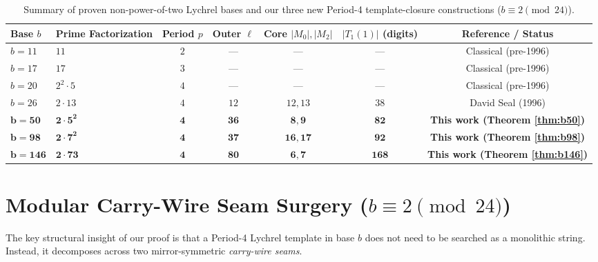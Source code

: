 \documentclass[11pt,a4paper]{article}
\theoremstyle{definition}
\theoremstyle{remark}
\begin{document}
\begin{table}[htbp]
\centering
\caption{Summary of proven non-power-of-two Lychrel bases and our three new Period-4 template-closure constructions ($b \equiv 2 \pmod{24}$).}
\label{tab:bases}
\small
\begin{tabular}{@{}llccccc@{}}
\toprule
\textbf{Base $b$} & \textbf{Prime Factorization} & \textbf{Period $p$} & \textbf{Outer $\ell$} & \textbf{Core $|M_0|, |M_2|$} & \textbf{$|T_1(1)|$ (digits)} & \textbf{Reference / Status} \\
\midrule
$b = 11$ & $11$ & $2$ & --- & --- & --- & Classical (pre-1996) \\
$b = 17$ & $17$ & $3$ & --- & --- & --- & Classical (pre-1996) \\
$b = 20$ & $2^2 \cdot 5$ & $4$ & --- & --- & --- & Classical (pre-1996) \\
$b = 26$ & $2 \cdot 13$ & $4$ & $12$ & $12, 13$ & $38$ & David Seal (1996) \\
\midrule
$\mathbf{b = 50}$ & $\mathbf{2 \cdot 5^2}$ & $\mathbf{4}$ & $\mathbf{36}$ & $\mathbf{8, 9}$ & $\mathbf{82}$ & \textbf{This work (Theorem \ref{thm:b50})} \\
$\mathbf{b = 98}$ & $\mathbf{2 \cdot 7^2}$ & $\mathbf{4}$ & $\mathbf{37}$ & $\mathbf{16, 17}$ & $\mathbf{92}$ & \textbf{This work (Theorem \ref{thm:b98})} \\
$\mathbf{b = 146}$ & $\mathbf{2 \cdot 73}$ & $\mathbf{4}$ & $\mathbf{80}$ & $\mathbf{6, 7}$ & $\mathbf{168}$ & \textbf{This work (Theorem \ref{thm:b146})} \\
\bottomrule
\end{tabular}
\end{table}

\section{Modular Carry-Wire Seam Surgery ($b \equiv 2 \pmod{24}$)}

The key structural insight of our proof is that a Period-4 Lychrel template in base $b$ does not need to be searched as a monolithic string. Instead, it decomposes across two mirror-symmetric \emph{carry-wire seams}.
\end{document}
